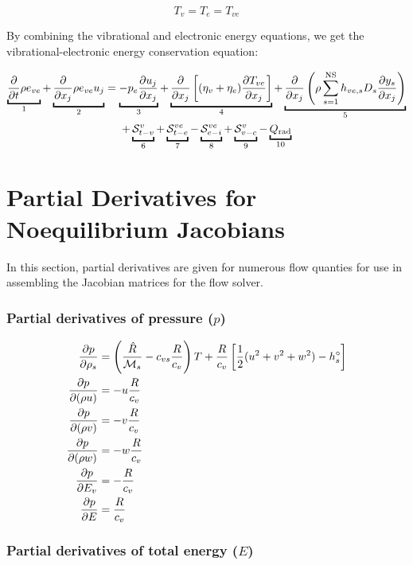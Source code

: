 \documentclass[10pt]{article}
\begin{document}
\begin{flushleft}
\begin{equation}
    T_v = T_e = T_{ve}
\end{equation}

By combining the vibrational and electronic energy equations, we get the vibrational-electronic energy conservation equation:

\begin{multline}
    \ub{ \pd{}{t} \rho e_{ve}}{1} + \ub{\pd{}{x_j} \rho e_{ve} u_j}{2} = \ub{- p_e \pd{u_j}{x_j}}{3} + \ub{\pd{}{x_j} \bb{(\eta_v + \eta_e) \pd{T_{ve}}{x_j}}}{4} + \ub{\pd{}{x_j} \bp{\rho \sum_{s=1}^\text{NS} h_{{ve},s} D_s \pd{y_s}{x_j}}}{5} \\ + \ub{\mathcal{S}_{t-v}^v}{6} + \ub{\mathcal{S}_{t-e}^{ve}}{7}  - \ub{\mathcal{S}_{e-i}^{ve}}{8} + \ub{\mathcal{S}_{v-c}^{v}}{9}- \ub{Q_\text{rad}}{10}
\end{multline}

\newpage
\section{Partial Derivatives for Noequilibrium Jacobians}

In this section, partial derivatives are given for numerous flow quanties for use in assembling the Jacobian matrices for the flow solver.

\subsubsection{Partial derivatives of pressure ($p$)}

\begin{subequations}
    \begin{align}
        \frac{\partial p}{\partial \rho_s} &= \left( \frac{\hat{R}}{\mathcal{M}_s} - c_{vs} \frac{R}{c_v} \right) T + \frac{R}{c_v} \left[ \frac{1}{2} (u^2 + v^2 + w^2) - h_s^\circ \right]
    \\ \frac{\partial p}{\partial (\rho u)} &= -u \frac{R}{c_v}
    \\ \frac{\partial p}{\partial (\rho v)} &= -v \frac{R}{c_v}
    \\ \frac{\partial p}{\partial (\rho w)} &= -w \frac{R}{c_v}
    \\ \frac{\partial p}{\partial E_v} &= -\frac{R}{c_v}
    \\ \frac{\partial p}{\partial E} &= \frac{R}{c_v}
    \end{align}
\end{subequations}

\subsubsection{Partial derivatives of total energy ($E$)}


\end{flushleft}
\end{document}

